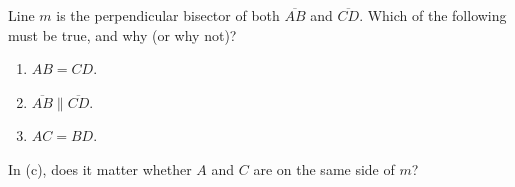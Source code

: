 Line $m$ is the perpendicular bisector of both $\overline{AB}$ and $\overline{CD}$. Which of the following must be true, and why (or why not)?
\begin{enumerate}
\item[(a)] $AB=CD$.
\item[(b)] $\overline{AB}\parallel\overline{CD}$.
\item[(c)] $AC=BD$.
\end{enumerate}
In (c), does it matter whether $A$ and $C$ are on the same side of $m$?

